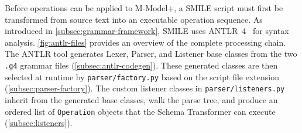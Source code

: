   Before operations can be applied to M-Model+, a SMILE  script must first be transformed from source text into an executable operation sequence. As introduced in \autoref{subsec:grammar-framework}, SMILE  uses
  ANTLR~4~\cite{parr2013definitive} for syntax analysis. \autoref{fig:antlr-files} provides an overview of the complete processing chain. The ANTLR tool generates Lexer,
   Parser, and Listener base classes from the two \texttt{.g4} grammar files (\autoref{subsec:antlr-codegen}). These generated classes are then selected at runtime by
  \texttt{parser/factory.py} based on the script file extension (\autoref{subsec:parser-factory}). The custom listener classes in \texttt{parser/listeners.py} inherit
  from the generated base classes, walk the parse tree, and produce an ordered list of \texttt{Operation} objects that the Schema Transformer can execute (\autoref{subsec:listeners}).

